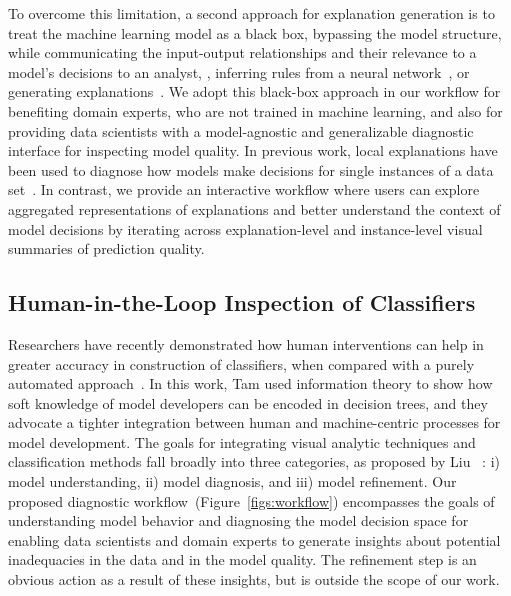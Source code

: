 To overcome this limitation, a second approach for explanation generation is to treat the machine learning model as a black box, bypassing the model structure, while communicating the input-output relationships and their relevance to a model's decisions to an analyst, \eg, inferring rules from a neural network~\cite{Craven98usingneural}, or generating explanations~\cite{DBLP:journals/corr/RibeiroSG16,prospector}. We adopt this black-box approach in our workflow for benefiting domain experts, who are not trained in machine learning, and also for providing data scientists with a model-agnostic and generalizable diagnostic interface for inspecting model quality. In previous work, local explanations have been used to diagnose how models make decisions for single instances of a data set~\cite{infuse,prospector,DBLP:journals/corr/RibeiroSG16}.
In contrast, we provide an interactive workflow where users can explore aggregated representations of explanations and better understand the context of model decisions by iterating across explanation-level and instance-level visual summaries of prediction quality.  










\vspace*{-1em}
\subsection{Human-in-the-Loop Inspection of Classifiers}%
\vspace*{-0.5em}
Researchers have recently demonstrated how human interventions can help in greater accuracy in construction of classifiers, when compared with a purely automated approach~\cite{tam2017analysis}. In this work, Tam \etal used information theory to show how soft knowledge of model developers can be encoded in decision trees, and they advocate a tighter integration between human and machine-centric processes for model development. The goals for integrating visual analytic techniques and classification methods fall broadly into three categories, as proposed by Liu \etal~\cite{liu2017towards}: i) model understanding, ii) model diagnosis, and iii) model refinement. Our proposed diagnostic workflow~(Figure~\ref{figs:workflow}) encompasses the goals of understanding model behavior and diagnosing the model decision space for enabling data scientists and domain experts to generate insights about potential inadequacies in the data and in the model quality. The refinement step is an obvious action as a result of these insights, but is outside the scope of our work.

